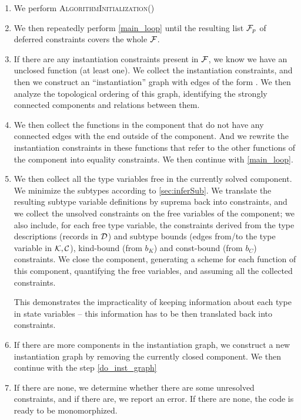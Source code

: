 \begin{enumerate}
    \item We perform \textsc{AlgorithmInitialization()}

    \item We then repeatedly perform \cref{main_loop} until the resulting list $\mathcal F_p$ of deferred constraints covers the whole $\mathcal{F}$.

    \item If there are any instantiation constraints present in $\mathcal F$, we know we have an unclosed function (at least one). We collect the instantiation constraints, and then we construct an ``instantiation'' graph with edges of the form . We then analyze the topological ordering of this graph, identifying the strongly connected components and relations between them.

    \item We then collect the functions in the component that do not have any connected edges with the  end outside of the component. And we rewrite the instantiation constraints in these functions that refer to the other functions of the component into equality constraints. We then continue with \cref{main_loop}. \label{do_inst_graph}

    \item We then collect all the type variables free in the currently solved component. We minimize the subtypes according to \cref{sec:inferSub}. We translate the resulting subtype variable definitions by suprema back into constraints, and we collect the unsolved constraints on the free variables of the component; we also include, for each free type variable, the constraints derived from the type descriptions (records in $\mathcal{D}$) and subtype bounds (edges from/to the type variable in $\mathcal K, \mathcal C$), kind-bound (from $b_K$) and const-bound (from $b_C$) constraints. We close the component, generating a scheme for each function of this component, quantifying the free variables, and assuming all the collected constraints. \label{closing}

    This demonstrates the impracticality of keeping information about each type in state variables -- this information has to be then translated back into constraints.

    \item If there are more components in the instantiation graph, we construct a new instantiation graph by removing the currently closed component. We then continue with the step \ref{do_inst_graph}

    \item If there are none, we determine whether there are some unresolved constraints, and if there are, we report an error. If there are none, the code is ready to be monomorphized.
\end{enumerate}

